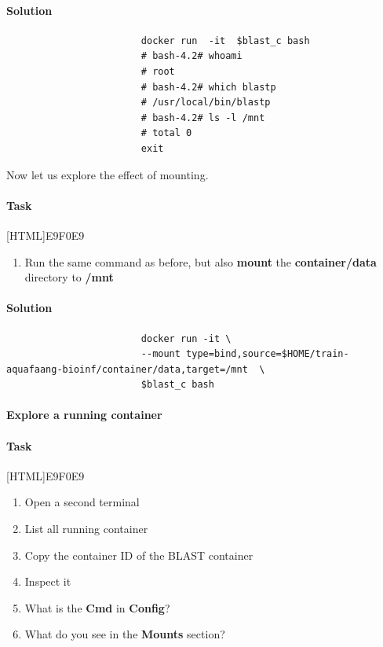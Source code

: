 \documentclass[12pt]{article}
\begin{document}
			\paragraph{Solution}	
	
				\begin{minipage}{\linewidth}			
					\begin{lstlisting}
						docker run  -it  $blast_c bash
						# bash-4.2# whoami
						# root
						# bash-4.2# which blastp
						# /usr/local/bin/blastp
						# bash-4.2# ls -l /mnt
						# total 0
						exit
					\end{lstlisting}
				\end{minipage}	
			
				Now let us explore the effect of mounting.
			
				\paragraph{Task}
					[HTML]{E9F0E9}{\parbox{\linewidth}{%
							\begin{enumerate}
								\item 	Run the same command as before, but also \textbf{mount} the \textbf{container/data} directory to \textbf{/mnt} 
							\end{enumerate}
					}}
	
				\paragraph{Solution}	
		
					\begin{minipage}{\linewidth}
						\begin{lstlisting}
						docker run -it \
						--mount type=bind,source=$HOME/train-aquafaang-bioinf/container/data,target=/mnt  \
						$blast_c bash
					\end{lstlisting}
				\end{minipage}
			
 			\paragraph{Explore a running container}
		
	
			\paragraph{Task}
				[HTML]{E9F0E9}{\parbox{\linewidth}{%
						\begin{enumerate}
							\item Open a second terminal
							\item List all running container
							\item Copy the container ID of the BLAST container
							\item Inspect it
							\item What is the \textbf{Cmd} in \textbf{Config}?
							\item  What do you see in the \textbf{Mounts} section?
						\end{enumerate}
				}}
\end{document}
